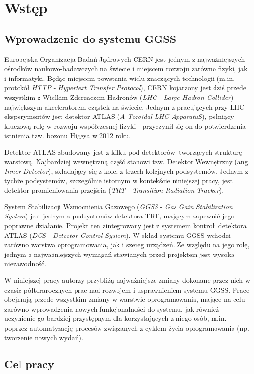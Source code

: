 \chapter{Wstęp}
\label{cha:wstep}

\section{Wprowadzenie do systemu GGSS}

Europejska Organizacja Badań Jądrowych CERN jest jednym z najważniejszych ośrodków naukowo-badawczych na świecie i miejscem rozwoju zarówno fizyki, jak i informatyki. Będąc miejscem powstania wielu znaczących technologii (m.in. protokół \emph{HTTP} - \emph{Hypertext Transfer Protocol}), CERN kojarzony jest dziś przede wszystkim z Wielkim Zderzaczem Hadronów (\emph{LHC} - \emph{Large Hadron Collider}) - największym akceleratorem cząstek na świecie. Jednym z pracujących przy LHC eksperymentów jest detektor ATLAS (\emph{A Toroidal LHC ApparatuS}), pełniący kluczową rolę w rozwoju współczesnej fizyki - przyczynił się on do potwierdzenia istnienia tzw. bozonu Higgsa w 2012 roku. 

Detektor ATLAS zbudowany jest z kilku pod-detektorów, tworzących strukturę warstową. Najbardziej wewnętrzną część stanowi tzw. Detektor Wewnętrzny (ang. \emph{Inner Detector}), składający się z kolei z trzech kolejnych podsystemów. Jednym z tychże podsystemów, szczególnie istotnym w kontekście niniejszej pracy, jest detektor promieniowania przejścia (\emph{TRT} - \emph{Transition Radiation Tracker}). 

System Stabilizacji Wzmocnienia Gazowego (\emph{GGSS} - \emph{Gas Gain Stabilization System}) jest jednym z podsystemów detektora TRT, mającym zapewnić jego poprawne działanie. Projekt ten zintegrowany jest z systemem kontroli detektora ATLAS (\emph{DCS} - \emph{Detector Control System}). W skład systemu GGSS wchodzi zarówno warstwa oprogramowania, jak i szereg urządzeń. Ze względu na jego rolę, jednym z najważniejszych wymagań stawianych przed projektem jest wysoka niezawodność.

W niniejszej pracy autorzy przybliżą najważniejsze zmiany dokonane przez nich w czasie półtorarocznych prac nad rozwojem i usprawnieniem systemu GGSS. Prace obejmują przede wszystkim zmiany w warstwie oprogramowania, mające na celu zarówno wprowadzenia nowych funkcjonalności do systemu, jak również uczynienie go bardziej przystępnym dla korzystających z niego osób, m.in. poprzez automatyzację procesów związanych z cyklem życia oprogramowania (np. tworzenie nowych wydań).


\section{Cel pracy}
